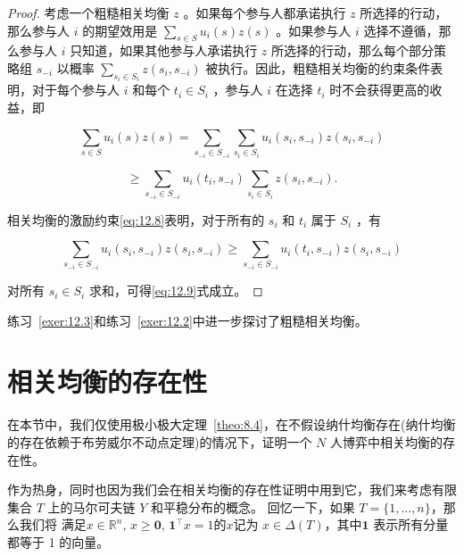 \begin{proof}
考虑一个粗糙相关均衡 \(z\) 。如果每个参与人都承诺执行 \(z\) 所选择的行动，那么参与人 \(i\) 的期望效用是 \(\mathop{\sum }\limits_{{s \in  S}}{u}_{i}\left( s\right) z\left( s\right)\) 。如果参与人 \(i\) 选择不遵循，那么参与人 \(i\) 只知道，如果其他参与人承诺执行 \(z\) 所选择的行动，那么每个部分策略组 \({s}_{-i}\) 以概率 \(\mathop{\sum }\limits_{{{s}_{i} \in  {S}_{i}}}z\left( {{s}_{i},{s}_{-i}}\right)\) 被执行。因此，粗糙相关均衡的约束条件表明，对于每个参与人 \(i\) 和每个 \({t}_{i} \in  {S}_{i}\) ，参与人 \(i\) 在选择 \({t}_{i}\) 时不会获得更高的收益，即

\begin{equation}
\mathop{\sum }\limits_{{s \in  S}}{u}_{i}\left( s\right) z\left( s\right)  = \mathop{\sum }\limits_{{{s}_{-i} \in  {S}_{-i}}}\mathop{\sum }\limits_{{{s}_{i} \in  {S}_{i}}}{u}_{i}\left( {{s}_{i},{s}_{-i}}\right) z\left( {{s}_{i},{s}_{-i}}\right)  \label{eq:12.9}
\end{equation}

\[
\geq  \mathop{\sum }\limits_{{{s}_{-i} \in  {S}_{-i}}}{u}_{i}\left( {{t}_{i},{s}_{-i}}\right) \mathop{\sum }\limits_{{{s}_{i} \in  {S}_{i}}}z\left( {{s}_{i},{s}_{-i}}\right) .
\]

相关均衡的激励约束\eqref{eq:12.8}表明，对于所有的 \({s}_{i}\) 和 \({t}_{i}\) 属于 \({S}_{i}\) ，有

\begin{equation}
\mathop{\sum }\limits_{{{s}_{-i} \in  {S}_{-i}}}{u}_{i}\left( {{s}_{i},{s}_{-i}}\right) z\left( {{s}_{i},{s}_{-i}}\right)  \geq  \mathop{\sum }\limits_{{{s}_{-i} \in  {S}_{-i}}}{u}_{i}\left( {{t}_{i},{s}_{-i}}\right) z\left( {{s}_{i},{s}_{-i}}\right)  \label{eq:12.10}
\end{equation}

对所有 \({s}_{i} \in  {S}_{i}\) 求和，可得\eqref{eq:12.9}式成立。
\end{proof}

练习~\ref{exer:12.3}和练习~\ref{exer:12.2}中进一步探讨了粗糙相关均衡。

\section{相关均衡的存在性}\label{sec12.5}

在本节中，我们仅使用极小极大定理~\ref{theo:8.4}，在不假设纳什均衡存在(纳什均衡的存在依赖于布劳威尔不动点定理)的情况下，证明一个 \(N\) 人博弈中相关均衡的存在性。

作为热身，同时也因为我们会在相关均衡的存在性证明中用到它，我们来考虑有限集合 \(T\) 上的马尔可夫链 \(Y\) 和平稳分布的概念。
回忆一下，如果 \(T = \{ 1,\ldots ,n\}\)，那么我们将 满足\(x \in  {\mathbb{R}}^{n}, \, x \geq  \bm{0}, \, {\bm{1}}^{\top }x = 1\)的\(x\)记为 \(x \in  \Delta \left( T\right)\)，其中\(\bm{1}\) 表示所有分量都等于 1 的向量。

